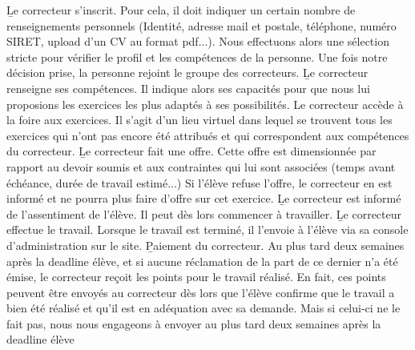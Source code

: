 ﻿\begin{enumerate}
	\li \b{Le correcteur s'inscrit.} Pour cela, il doit indiquer un certain nombre de renseignements personnels  (Identité, adresse mail et postale, téléphone, numéro SIRET, upload d'un CV au format pdf...). Nous effectuons alors une sélection stricte pour vérifier le profil et les compétences de la personne. Une fois notre décision prise, la personne rejoint le groupe des correcteurs.
	\li\b{Le correcteur renseigne ses compétences.} Il indique alors ses capacités pour que nous lui proposions les exercices les plus adaptés à ses possibilités.
	\li \b{ Le correcteur accède à la foire aux exercices.} Il s'agit d'un lieu virtuel dans lequel se trouvent tous les exercices qui n'ont pas encore été attribués et qui correspondent aux compétences du correcteur.
	\li \b{Le correcteur fait une offre.}  Cette offre est dimensionnée par rapport au devoir soumis et aux contraintes qui lui sont associées (temps avant échéance, durée de travail estimé...) Si l'élève refuse l'offre, le correcteur en est informé et ne pourra plus faire d'offre sur cet exercice.
	\li \b{Le correcteur est informé de l'assentiment de l'élève.} Il peut dès lors commencer à travailler.
	\li \b{Le correcteur effectue le travail.} Lorsque le travail est terminé, il l'envoie à l'élève via sa console d'administration sur le site.
	\li \b{Paiement du correcteur.} Au plus tard deux semaines après la deadline élève, et si aucune réclamation de la part de ce dernier n'a été émise, le correcteur reçoit les points pour le travail réalisé. En fait, ces points peuvent être envoyés au correcteur dès lors que l'élève confirme que le travail a bien été réalisé et qu'il est en adéquation avec sa demande. Mais si celui-ci ne le fait pas, nous nous engageons à envoyer au plus tard deux semaines après la deadline élève
\end{enumerate}